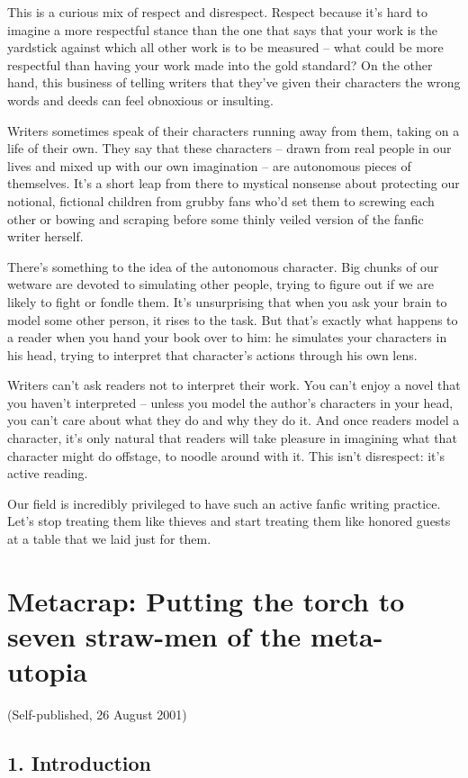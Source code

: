 This is a curious mix of respect and disrespect. Respect because
it's hard to imagine a more respectful stance than the one that
says that your work is the yardstick against which all other work
is to be measured -- what could be more respectful than having your
work made into the gold standard? On the other hand, this business
of telling writers that they've given their characters the wrong
words and deeds can feel obnoxious or insulting.

Writers sometimes speak of their characters running away from them,
taking on a life of their own. They say that these characters --
drawn from real people in our lives and mixed up with our own
imagination -- are autonomous pieces of themselves. It's a short
leap from there to mystical nonsense about protecting our notional,
fictional children from grubby fans who'd set them to screwing each
other or bowing and scraping before some thinly veiled version of
the fanfic writer herself.

There's something to the idea of the autonomous character. Big
chunks of our wetware are devoted to simulating other people,
trying to figure out if we are likely to fight or fondle them. It's
unsurprising that when you ask your brain to model some other
person, it rises to the task. But that's exactly what happens to a
reader when you hand your book over to him: he simulates your
characters in his head, trying to interpret that character's
actions through his own lens.

Writers can't ask readers not to interpret their work. You can't
enjoy a novel that you haven't interpreted -- unless you model the
author's characters in your head, you can't care about what they do
and why they do it. And once readers model a character, it's only
natural that readers will take pleasure in imagining what that
character might do offstage, to noodle around with it. This isn't
disrespect: it's active reading.

Our field is incredibly privileged to have such an active fanfic
writing practice. Let's stop treating them like thieves and start
treating them like honored guests at a table that we laid just for
them.

\section{Metacrap: Putting the torch to seven straw-men of the meta-utopia}

(Self-published, 26 August 2001)

\subsection{1. Introduction}

